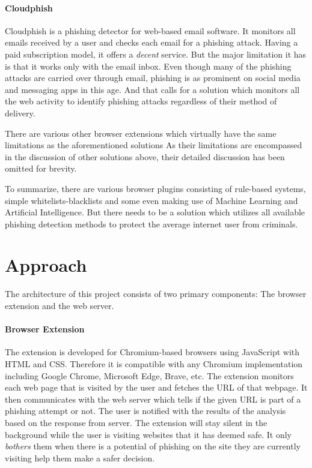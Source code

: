 \documentclass[conference]{IEEEtran}
\begin{document}
\paragraph{Cloudphish\cite{Cloudphish}}
Cloudphish is a phishing detector for web-based email software.
It monitors all emails received by a user and checks each email for a phishing attack.
Having a paid subscription model, it offers a \emph{decent} service.
But the major limitation it has is that it works only with the email inbox.
Even though many of the phishing attacks are carried over through email, phishing is as prominent on social media and messaging apps in this age.
And that calls for a solution which monitors all the web activity to identify phishing attacks regardless of their method of delivery.

\par There are various other browser extensions which virtually have the same limitations as the aforementioned solutions\cite{BlueArca}\cite{Retruster}\cite{PhishingBoat}
As their limitations are encompassed in the discussion of other solutions above, their detailed discussion has been omitted for brevity.

\par To summarize, there are various browser plugins consisting of rule-based systems, simple whitelists-blacklists and some even making use of Machine Learning and Artificial Intelligence. But there needs to be a solution which utilizes all available phishing detection methods to protect the average internet user from criminals.

\section{Approach}
The architecture of this project consists of two primary components: The browser extension and the web server.

\paragraph{Browser Extension}
The extension is developed for Chromium-based browsers using JavaScript with HTML and CSS.
Therefore it is compatible with any Chromium implementation including Google Chrome, Microsoft Edge, Brave, etc.
The extension monitors each web page that is visited by the user and fetches the URL of that webpage.
It then communicates with the web server which tells if the given URL is part of a phishing attempt or not.
The user is notified with the results of the analysis based on the response from server.
The extension will stay silent in the background while the user is visiting websites that it has deemed safe.
It only \emph{bothers} them when there is a potential of phishing on the site they are currently visiting help them make a safer decision.
\end{document}
